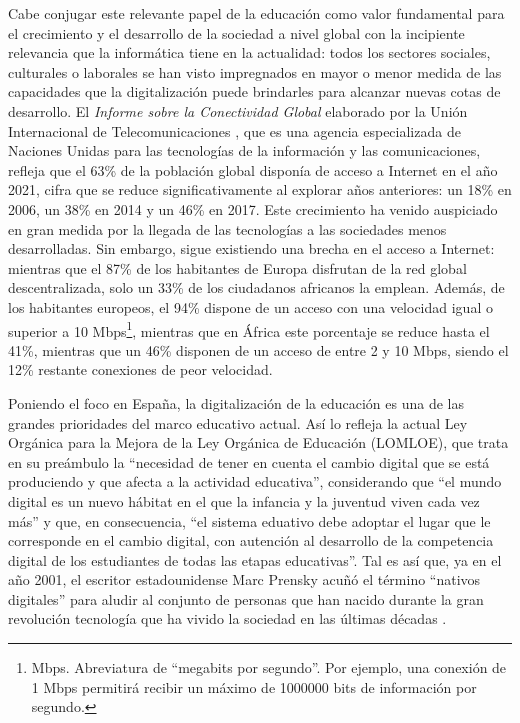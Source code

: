 Cabe conjugar este relevante papel de la educación como valor fundamental para el crecimiento y el desarrollo de la sociedad a nivel global con la incipiente relevancia que la informática tiene en la actualidad: todos los sectores sociales, culturales o laborales se han visto impregnados en mayor o menor medida de las capacidades que la digitalización puede brindarles para alcanzar nuevas cotas de desarrollo. El \textit{Informe sobre la Conectividad Global} elaborado por la Unión Internacional de Telecomunicaciones \cite{UITConectividad}, que es una agencia especializada de Naciones Unidas para las tecnologías de la información y las comunicaciones, refleja que el 63\% de la población global disponía de acceso a Internet en el año 2021, cifra que se reduce significativamente al explorar años anteriores: un 18\% en 2006, un 38\% en 2014 y un 46\% en 2017. Este crecimiento ha venido auspiciado en gran medida por la llegada de las tecnologías a las sociedades menos desarrolladas. Sin embargo, sigue existiendo una brecha en el acceso a Internet: mientras que el 87\% de los habitantes de Europa disfrutan de la red global descentralizada, solo un 33\% de los ciudadanos africanos la emplean. Además, de los habitantes europeos, el 94\% dispone de un acceso con una velocidad igual o superior a 10 Mbps\footnote{Mbps. Abreviatura de ``megabits por segundo''. Por ejemplo, una conexión de 1 Mbps permitirá recibir un máximo de 1000000 bits de información por segundo.}, mientras que en África este porcentaje se reduce hasta el 41\%, mientras que un 46\% disponen de un acceso de entre 2 y 10 Mbps, siendo el 12\% restante conexiones de peor velocidad.

Poniendo el foco en España, la digitalización de la educación es una de las grandes prioridades del marco educativo actual. Así lo refleja la actual Ley Orgánica para la Mejora de la Ley Orgánica de Educación \cite{LOMLOE} (LOMLOE), que trata en su preámbulo la ``necesidad de tener en cuenta el cambio digital que se está produciendo y que afecta a la actividad educativa'', considerando que ``el mundo digital es un nuevo hábitat en el que la infancia y la juventud viven cada vez más'' y que, en consecuencia, ``el sistema eduativo debe adoptar el lugar que le corresponde en el cambio digital, con autención al desarrollo de la competencia digital de los estudiantes de todas las etapas educativas''. Tal es así que, ya en el año 2001, el escritor estadounidense Marc Prensky acuñó el término ``nativos digitales'' para aludir al conjunto de personas que han nacido durante la gran revolución tecnología que ha vivido la sociedad en las últimas décadas \cite{Prensky}.

